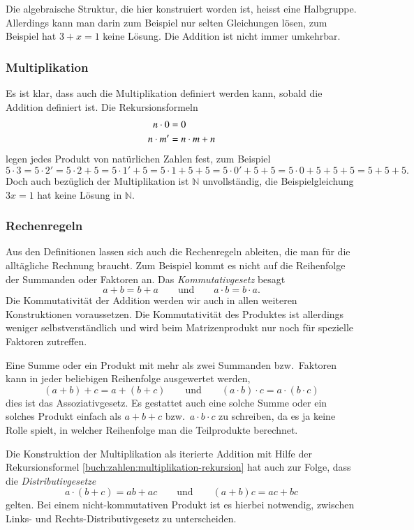 Die algebraische Struktur, die hier konstruiert worden ist, heisst
eine Halbgruppe.
Allerdings kann man darin zum Beispiel nur selten Gleichungen
lösen, zum Beispiel hat $3+x=1$ keine Lösung.
Die Addition ist nicht immer umkehrbar.

\subsubsection{Multiplikation}
Es ist klar, dass auch die Multiplikation definiert werden kann, 
sobald die Addition definiert ist.
Die Rekursionsformeln
\begin{align}
n\cdot 0 &= 0 \notag \\
n\cdot m' &= n\cdot m + n
\label{buch:zahlen:multiplikation-rekursion}
\end{align}
legen jedes Produkt von natürlichen Zahlen fest, zum Beispiel
\[
5\cdot 3
=
5\cdot 2'
=
5\cdot 2 + 5
=
5\cdot 1' + 5
=
5\cdot 1 + 5 + 5
=
5\cdot 0' + 5 + 5
=
5\cdot 0 + 5 + 5 + 5
=
5 + 5 + 5.
\]
Doch auch bezüglich der Multiplikation ist $\mathbb{N}$ unvollständig,
die Beispielgleichung $3x=1$ hat keine Lösung in $\mathbb{N}$.

\subsubsection{Rechenregeln}
Aus den Definitionen lassen sich auch die Rechenregeln ableiten,
die man für die alltägliche Rechnung braucht.
Zum Beispiel kommt es nicht auf die Reihenfolge der Summanden
oder Faktoren an. 
Das {\em Kommutativgesetz} besagt
\[
a+b=b+a
\qquad\text{und}\qquad
a\cdot b = b\cdot a.
\]
%
Die Kommutativität der Addition werden wir auch in allen weiteren
Konstruktionen voraussetzen.
Die Kommutativität des Produktes ist allerdings weniger selbstverständlich
und wird beim Matrizenprodukt nur noch für spezielle Faktoren zutreffen.

Eine Summe oder ein Produkt mit mehr als zwei Summanden bzw.~Faktoren
kann in jeder beliebigen Reihenfolge ausgewertet werden,
\[
(a+b)+c
=
a+(b+c)
\qquad\text{und}\qquad
(a\cdot b)\cdot c
=
a\cdot (b\cdot c)
\]
dies ist das Assoziativgesetz.
Es gestattet auch eine solche Summe oder ein solches Produkt einfach
als $a+b+c$ bzw.~$a\cdot b\cdot c$ zu schreiben, da es ja keine Rolle
spielt, in welcher Reihenfolge man die Teilprodukte berechnet.

Die Konstruktion der Multiplikation als iterierte Addition mit Hilfe
der Rekursionsformel \eqref{buch:zahlen:multiplikation-rekursion}
hat auch zur Folge, dass die {\em Distributivgesetze}
\[
a\cdot(b+c) = ab+ac
\qquad\text{und}\qquad
(a+b)c = ac+bc
\]
gelten.
Bei einem nicht-kommutativen Produkt ist es hierbei notwendig,
zwischen Links- und Rechts-Distributivgesetz zu unterscheiden.

